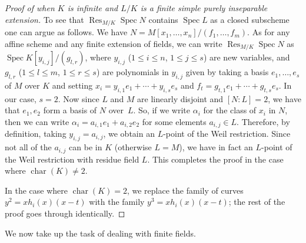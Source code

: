 \documentclass[11pt, reqno]{amsart}
\numberwithin{equation}{section}
\theoremstyle{definition}
\theoremstyle{remark}
\begin{document}
\begin{proof}[Proof of  when $K$ is infinite and $L/K$ is a finite simple \emph{purely inseparable} extension]
To see that $\operatorname{Res}_{M/K}\operatorname{Spec}N$ contains $\operatorname{Spec}L$ as a closed subscheme one can argue as follows.
 We have $N=M[x_1,\dots,x_n]/(f_1,\dots,f_m)$.
As for any affine scheme and any finite extension of fields, we can write 
$
{\displaystyle \operatorname {Res} _{M/K}\operatorname{Spec}N}
$
as 
$\operatorname{Spec} K[y_{{i,j}}]/(g_{{l,r}})$, where $y_{i,j}$ ($1\leq i\leq n$, $1\leq j\leq s$) are new variables, and 
$g_{l,r}$ ($1 \leq l \leq m$, $1 \leq r \leq s$) are polynomials in 
$y_{i,j}$ given by taking a basis 
$
e_{1},\dots,e_{s}$ of $M$ over $K$ and setting 
$
x_{i}=y_{{i,1}}e_{1}+\cdots+y_{{i,s}}e_{s}$
 and 
$f_{t}=g_{{t,1}}e_{1}+\cdots + g_{{t,s}}e_{s}$.  In our case, $s=2$. Now since $L$ and $M$ are linearly disjoint and $[N:L]=2$, we have that $e_1,e_2$ form a basis of $N$ over~$L$. So, if we write $\alpha_i$ for the class of $x_i$ in $N$, then we can write $\alpha_i=a_{i,1}e_1+a_{i,2}e_2$ for some elements $a_{i,j}\in L$.  Therefore, by definition, taking $y_{i,j}=a_{i,j}$, we obtain an $L$-point of the Weil restriction. Since not all of the $a_{i,j}$ can be in $K$ (otherwise $L=M$), we have in fact an $L$-point of the Weil restriction with residue field $L$.  This completes the proof in the case where $\operatorname{char}(K)\ne 2$.

In the case where $\operatorname{char}(K)=2$, we replace the family of curves $y^2 = xh_i(x)(x-t)$
with the family $y^3 = x h_i(x)(x-t)$; the rest of the proof goes through identically.
\end{proof}



We now take up the task of dealing with finite fields.
\end{document}
